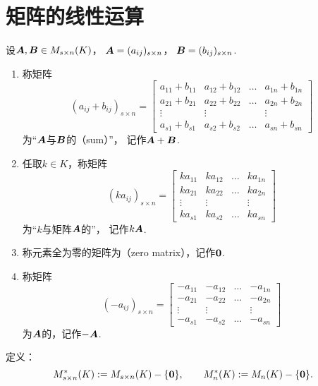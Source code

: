 \section{矩阵的线性运算}
\begin{definition}
设\(\boldsymbol{A},\boldsymbol{B}\in M_{s\times n}(K)\)，
\(\boldsymbol{A}=(a_{ij})_{s \times n}\)，
\(\boldsymbol{B}=(b_{ij})_{s \times n}\).
\begin{enumerate}
	\item 称矩阵\[
		(a_{ij} + b_{ij})_{s \times n} = \begin{bmatrix}
			a_{11}+b_{11} & a_{12}+b_{12} & \dots & a_{1n}+b_{1n} \\
			a_{21}+b_{21} & a_{22}+b_{22} & \dots & a_{2n}+b_{2n} \\
			\vdots & \vdots & & \vdots \\
			a_{s1}+b_{s1} & a_{s2}+b_{s2} & \dots & a_{sn}+b_{sn}
		\end{bmatrix}
	\]为“\(\boldsymbol{A}\)与\(\boldsymbol{B}\)的（sum）”，
	记作\(\boldsymbol{A}+\boldsymbol{B}\).

	\item 任取\(k\in K\)，称矩阵\[
		(ka_{ij})_{s \times n} = \begin{bmatrix}
			ka_{11} & ka_{12} & \dots & ka_{1n} \\
			ka_{21} & ka_{22} & \dots & ka_{2n} \\
			\vdots & \vdots & & \vdots \\
			ka_{s1} & ka_{s2} & \dots & ka_{sn}
		\end{bmatrix}
	\]为“\(k\)与矩阵\(\boldsymbol{A}\)的”，
	记作\(k\boldsymbol{A}\).

	\item 称元素全为零的矩阵为（zero matrix），记作\(\boldsymbol0\).

	\item 称矩阵\[
		(-a_{ij})_{s \times n}=\begin{bmatrix}
			-a_{11} & -a_{12} & \dots & -a_{1n} \\
			-a_{21} & -a_{22} & \dots & -a_{2n} \\
			\vdots & \vdots & & \vdots \\
			-a_{s1} & -a_{s2} & \dots & -a_{sn}
		\end{bmatrix}
	\]为\(\boldsymbol{A}\)的，记作\(-\boldsymbol{A}\).
\end{enumerate}
\end{definition}

定义：\[
	M_{s \times n}^*(K) := M_{s \times n}(K)-\{\boldsymbol0\},
	\qquad
	M_n^*(K) := M_n(K)-\{\boldsymbol0\}.
\]

